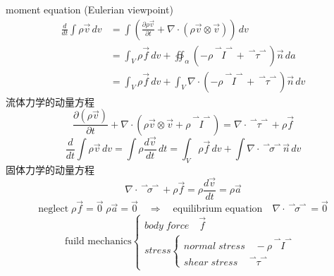 \documentclass[12pt, a4paper, oneside, UTF8]{ctexbook}  %
\newcommand{\pa}{\partial}
\newcommand{\vvec}{\overset{\rightharpoonup\!\!\!\! \rightharpoonup}}
\begin{document}
\begin{defn}
    moment equation	(Eulerian viewpoint)
\begin{align*}
    \frac{d}{dt}\int \rho\vec{v}\,dv
    &=\int \left(\frac{\pa \rho\vec{v}}{\pa t}+\nabla\cdot(\rho\vec{v}\otimes\vec{v})\right)\,dv\\
    &=\int_{V}\rho\vec{f}\,dv+\oiint_\alpha(-\rho\vvec{I}+\vvec{\tau})\vec{n}\,da\\
    &=\int_{V}\rho\vec{f}\,dv+\int_{V}\nabla\cdot(-\rho\vvec{I}+\vvec{\tau})\vec{n}\,dv
\end{align*}
流体力学的动量方程
\[
\frac{\pa(\rho\vec{v})}{\pa t}+\nabla\cdot(\rho\vec{v}\otimes\vec{v}+\rho\vvec{I})
=\nabla\cdot\vvec{\tau}+\rho\vec{f}
\]
\[
    \frac{d}{dt}\int \rho\vec{v}\,dv=\int\rho\frac{d\vec{v}}{dt}\,dt
    =\int_{V}\rho\vec{f}\,dv+\int\nabla\cdot\vvec{\sigma}\vec{n}\,dv
\]
固体力学的动量方程
\[
    \nabla\cdot\vvec{\sigma}+\rho\vec{f}=\rho\frac{d\vec{v}}{dt}=\rho\vec{a}
\]
\[\text{neglect}\;\rho\vec{f}=\vec{0}\;\rho\vec{a}=\vec{0}\quad\Rightarrow\quad
\text{equilibrium equation}\quad\nabla\cdot\vvec{\sigma}=\vec{0}\]
\[\text{fuild mechanics}\begin{cases}
    body\;force\quad \vec{f}\\
    stress\begin{cases}
        normal\;stress\quad -\rho\vvec{I}\\
        shear\;stress\quad \vvec{\tau}
    \end{cases}
\end{cases}\]
\end{defn}
\end{document}
